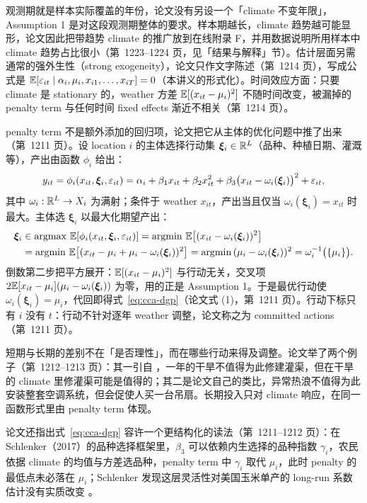 观测期就是样本实际覆盖的年份，论文没有另设一个「climate 不变年限」，Assumption 1 是对这段观测期整体的要求。样本期越长，climate 趋势越可能显形，论文因此把带趋势 climate 的推广放到在线附录 F，并用数据说明所用样本中 climate 趋势占比很小（第~1223--1224 页，见「结果与解释」节）。估计层面另需通常的强外生性（strong exogeneity），论文只作文字陈述（第~1214 页），写成公式是 $\mathbb{E}[\varepsilon_{it}\mid \alpha_i,\mu_i,x_{i1},\dots,x_{iT}]=0$（本讲义的形式化）。时间效应方面：只要 climate 是 stationary 的，weather 方差 $\mathbb{E}[(x_{it}-\mu_i)^2]$ 不随时间改变，被漏掉的 penalty term 与任何时间 fixed effects 渐近不相关（第~1214 页）。

\begin{intuition}
penalty term 不是额外添加的回归项，论文把它从主体的优化问题中推了出来（第~1211 页）。设 location $i$ 的主体选择行动集 $\boldsymbol{\xi}_i\in\mathbb{R}^L$（品种、种植日期、灌溉等），产出由函数 $\phi_i$ 给出：
\begin{equation*}
y_{it}=\phi_i(x_{it},\boldsymbol{\xi}_i,\varepsilon_{it})
=\alpha_i+\beta_1 x_{it}+\beta_2 x_{it}^2+\beta_3\bigl(x_{it}-\omega_i(\boldsymbol{\xi}_i)\bigr)^2+\varepsilon_{it},
\end{equation*}
其中 $\omega_i:\mathbb{R}^L\to X_i$ 为满射；条件于 weather $x_{it}$，产出当且仅当 $\omega_i(\boldsymbol{\xi}_i)=x_{it}$ 时最大。主体选 $\boldsymbol{\xi}_i$ 以最大化期望产出：
\begin{align*}
\boldsymbol{\xi}_i&\in\operatorname{argmax}\,\mathbb{E}[\phi_i(x_{it},\boldsymbol{\xi}_i,\varepsilon_{it})]
=\operatorname{argmin}\,\mathbb{E}\bigl[(x_{it}-\omega_i(\boldsymbol{\xi}_i))^2\bigr]\\
&=\operatorname{argmin}\,\mathbb{E}\bigl[(x_{it}-\mu_i+\mu_i-\omega_i(\boldsymbol{\xi}_i))^2\bigr]
=\operatorname{argmin}\,(\mu_i-\omega_i(\boldsymbol{\xi}_i))^2
=\omega_i^{-1}\bigl(\{\mu_i\}\bigr).
\end{align*}
倒数第二步把平方展开：$\mathbb{E}[(x_{it}-\mu_i)^2]$ 与行动无关，交叉项 $2\mathbb{E}[x_{it}-\mu_i](\mu_i-\omega_i(\boldsymbol{\xi}_i))$ 为零，用的正是 Assumption 1。于是最优行动使 $\omega_i(\boldsymbol{\xi}_i)=\mu_i$，代回即得式~\ref{eq:cca-dgp}（论文式 (1)，第~1211 页）。行动下标只有 $i$ 没有 $t$：行动不针对逐年 weather 调整，论文称之为 committed actions（第~1211 页）。

短期与长期的差别不在「是否理性」，而在哪些行动来得及调整。论文举了两个例子（第~1212--1213 页）：其一引自 \citet{auffhammer2014empirical}，一年的干旱不值得为此修建灌渠，但在干旱的 climate 里修灌渠可能是值得的；其二是论文自己的类比，异常热浪不值得为此安装整套空调系统，但会促使人买一台吊扇。长期投入只对 climate 响应，在同一函数形式里由 penalty term 体现。

论文还指出式~\ref{eq:cca-dgp} 容许一个更结构化的读法（第~1211--1212 页）：在 Schlenker（2017）的品种选择框架里，$\beta_3$ 可以依赖内生选择的品种指数 $\gamma_i$，农民依据 climate 的均值与方差选品种，penalty term 中 $\gamma_i$ 取代 $\mu_i$，此时 penalty 的最低点未必落在 $\mu_i$；Schlenker 发现这层灵活性对美国玉米单产的 long-run 系数估计没有实质改变 \citep{schlenker2017interannual}。
\end{intuition}

